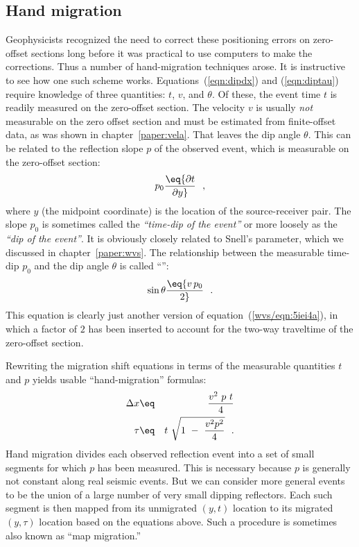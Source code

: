 \subsection{Hand migration}
\par
Geophysicists recognized the need to correct these positioning errors
on zero-offset sections long before it was practical to use computers
to make the corrections.
Thus a number of hand-migration techniques arose.
It is instructive to see how one such scheme works.  
Equations~(\ref{eqn:dipdx}) and (\ref{eqn:diptau}) require knowledge of three quantities:
$t$, $v$, and $\theta$.
Of these, the event time $t$ is readily measured on the zero-offset section.
The velocity $v$ is usually {\em not} measurable on the zero offset section
and must be estimated from finite-offset data,
as was shown in chapter~\ref{paper:vela}.
That leaves the dip angle $\theta$.
This can be related to the reflection slope $p$ of the observed event,
which is measurable on the zero-offset section: 
\begin{equation}
p_0 \eq {\partial t \over \partial y}  \ \ ,
\label{eqn:pdefn}
\end{equation}
where $y$ (the midpoint coordinate) is the location of the 
source-receiver pair.
The slope $p_0$ is sometimes called the {\em ``time-dip of the event''} or 
more loosely 
as the {\em ``dip of the event''}.
It is obviously closely related to Snell's parameter,
which we discussed in chapter~\ref{paper:wvs}.   
The relationship between the measurable time-dip $p_0$ 
and the dip angle $\theta$ is called
``'':
\begin{equation}
\sin\theta \eq {v\,p_0 \over 2}   \ \ .
\label{eqn:tuchel}
\end{equation}
This equation is clearly just another version
of equation~(\ref{wvs/eqn:5iei4a}),
in which a factor of $2$ has been inserted to account for the 
two-way traveltime
of the zero-offset section.

%

\par
Rewriting the migration shift equations in terms of the measurable
quantities $t$ and $p$ yields usable ``hand-migration'' formulas:
\begin{eqnarray}
\Delta x &\eq& {v^2\ p\ t \over 4}
\label{eqn:laydxp}
\\
\tau &\eq& t\ \sqrt{1\ -\ {v^2 p^2 \over 4} }  \ \  .
\label{eqn:laytaup}
\end{eqnarray}
Hand migration divides each observed reflection event
into a set of small segments for which $p$ has been measured.
This is necessary because $p$ is generally 
not constant along real seismic events.
But we can consider more general
events to be the union of a large number of very small dipping reflectors.
Each such segment is then mapped from its unmigrated $(y,t)$ location
to its migrated $(y,\tau)$ location based on the equations above.  
Such a procedure is sometimes also known as ``map migration.''  

